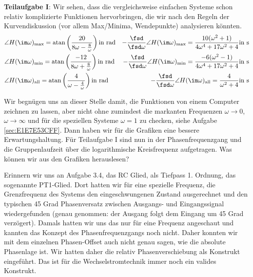 \begin{Loesung}
\textbf{Teilaufgabe I}: Wir sehen, dass die vergleichsweise einfachen Systeme
schon relativ  komplizierte Funktionen hervorbringen, die wir nach den Regeln der
Kurvendiskussion (vor allem Max/Minima, Wendepunkte) analysieren könnten.
%
\begin{align}
&\angle H(\im\omega)_\mathrm{max} =
\mathrm{atan}\left(\frac{20}{8\omega-\frac{8}{\omega}}\right)\text{in rad}
&-\frac{\fsd}{\fsd \omega} \angle H(\im\omega)_\mathrm{max}=
\frac{10(\omega^2+1)}{4\omega^4+17\omega^2+4}\text{in s}
\\
&\angle H(\im\omega)_\mathrm{min} =
\mathrm{atan}\left(\frac{-12}{8\omega+\frac{8}{\omega}}\right)\text{in rad}
&-\frac{\fsd}{\fsd \omega} \angle H(\im\omega)_\mathrm{min}=
\frac{-6(\omega^2-1)}{4\omega^4+17\omega^2+4}\text{in s}
\\
&\angle H(\im\omega)_\mathrm{all} =
\mathrm{atan}\left(\frac{4}{\omega-\frac{4}{\omega}}\right)\text{in rad}
&-\frac{\fsd}{\fsd \omega} \angle H(\im\omega)_\mathrm{all}=
\frac{4}{\omega^2+4}\text{in s}
\end{align}
%

Wir begnügen uns an dieser Stelle damit, die Funktionen von einem Computer zeichnen
zu lassen, aber nicht ohne zumindest die markanten Frequenzen $\omega\to 0$,
$\omega\to \infty$ und für die speziellen Systeme $\omega = 1$ zu checken, siehe
Aufgabe \ref{sec:E1E7E53CFF}. Dann haben wir für die Grafiken eine
bessere Erwartungshaltung.
%
Für Teilaufgabe I sind nun in
 der Phasenfrequenzgang
und die Gruppenlaufzeit über die logarithmische Kreisfrequenz aufgetragen.
%
Was können wir aus den Grafiken herauslesen?

Erinnern wir uns an Aufgabe 3.4,
das RC Glied, als Tiefpass 1. Ordnung, das sogenannte PT1-Glied.
Dort hatten wir für eine spezielle Frequenz, die Grenzfrequenz des Systems
den eingeschwungenen Zustand ausgerechnet und den typischen 45 Grad Phasenversatz
zwischen Ausgangs- und Eingangssignal wiedergefunden (genau genommen: der Ausgang
folgt dem Eingang um 45 Grad verzögert). Damals hatten wir uns das nur für
eine Frequenz angeschaut und kannten das Konzept des Phasenfrequenzgangs noch
nicht. Daher konnten wir mit dem einzelnen Phasen-Offset auch nicht genau sagen,
wie die absolute Phasenlage ist. Wir hatten daher die relativ Phasenverschiebung
als Konstrukt eingeführt. Das ist für die Wechselstromtechnik immer noch
ein valides Konstrukt.


\end{Loesung}
